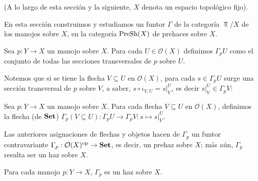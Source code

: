 (A lo largo de esta sección y la siguiente, $X$ denota un espacio topológico fijo).

En esta sección construimos y estudiamos un funtor $\Gamma$ de la categoría $\Top /X$ de los manojos sobre $X$, en la categoría $\normalfont{\text{PreSh}} (X)$ de prehaces sobre $X$.

\begin{Def}
   Sea $p:Y\to X$ un manojo sobre $X$. Para cada $U\in\mathcal{O}(X)$ definimos $\Gamma_p U$ como el conjunto de todas las secciones transversales de $p$ sobre $U$.
   
\end{Def}
Notemos que si se tiene la flecha $V\subseteq U$ en $\mathcal{O}(X)$, para cada $s\in\Gamma_p U$ surge una sección transversal de $p$ sobre $V$, a saber, $s\circ \iota_{V,U}=s|^{U}_{V}$, es decir $s|^{U}_{V}\in\Gamma_p V$:

\begin{Def}
   Sea $p:Y\to X$ un manojo sobre $X$. Para cada flecha $V\subseteq U$ en $\mathcal{O}(X)$, definimos la flecha (de $\normalfont{\textbf{Set}}$) $\Gamma_p(V\subseteq U):\Gamma_p U\to \Gamma_p V:s\mapsto s|^{U}_{V}$.
\end{Def}
Las anteriores asignaciones de flechas y objetos hacen de $\Gamma_p$ un funtor contravariante $\Gamma_p:\mathcal{O}(X)^{\text{op}}\to \normalfont{\textbf{Set}}$, es decir, un prehaz sobre $X$; más aún, $\Gamma_p$ resulta ser un haz sobre $X$.
\begin{Prop}
   Para cada manojo $p:Y\to X$, $\Gamma_p$ es un haz sobre $X$.
\end{Prop}

